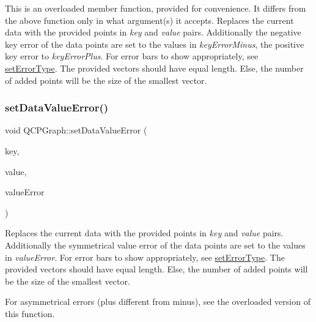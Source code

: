 This is an overloaded member function, provided for convenience. It differs from the above function only in what argument(s) it accepts. Replaces the current data with the provided points in {\itshape key} and {\itshape value} pairs. Additionally the negative key error of the data points are set to the values in {\itshape key\+Error\+Minus}, the positive key error to {\itshape key\+Error\+Plus}. For error bars to show appropriately, see \hyperlink{class_q_c_p_graph_ac3614d799c3894f2bc646e99c7f73d38}{set\+Error\+Type}. The provided vectors should have equal length. Else, the number of added points will be the size of the smallest vector. \hypertarget{class_q_c_p_graph_acba6296eadcb36b93267628b8dae3de5}{}\label{class_q_c_p_graph_acba6296eadcb36b93267628b8dae3de5} 
\subsubsection{\texorpdfstring{set\+Data\+Value\+Error()}{setDataValueError()}\hspace{0.1cm}{\footnotesize\ttfamily [1/2]}}
{\footnotesize\ttfamily void Q\+C\+P\+Graph\+::set\+Data\+Value\+Error (\begin{DoxyParamCaption}\item[{const Q\+Vector$<$ double $>$ \&}]{key,  }\item[{const Q\+Vector$<$ double $>$ \&}]{value,  }\item[{const Q\+Vector$<$ double $>$ \&}]{value\+Error }\end{DoxyParamCaption})}

Replaces the current data with the provided points in {\itshape key} and {\itshape value} pairs. Additionally the symmetrical value error of the data points are set to the values in {\itshape value\+Error}. For error bars to show appropriately, see \hyperlink{class_q_c_p_graph_ac3614d799c3894f2bc646e99c7f73d38}{set\+Error\+Type}. The provided vectors should have equal length. Else, the number of added points will be the size of the smallest vector.

For asymmetrical errors (plus different from minus), see the overloaded version of this function. \hypertarget{class_q_c_p_graph_a3afbfd7222d739351c69387904776f93}{}\label{class_q_c_p_graph_a3afbfd7222d739351c69387904776f93} 
